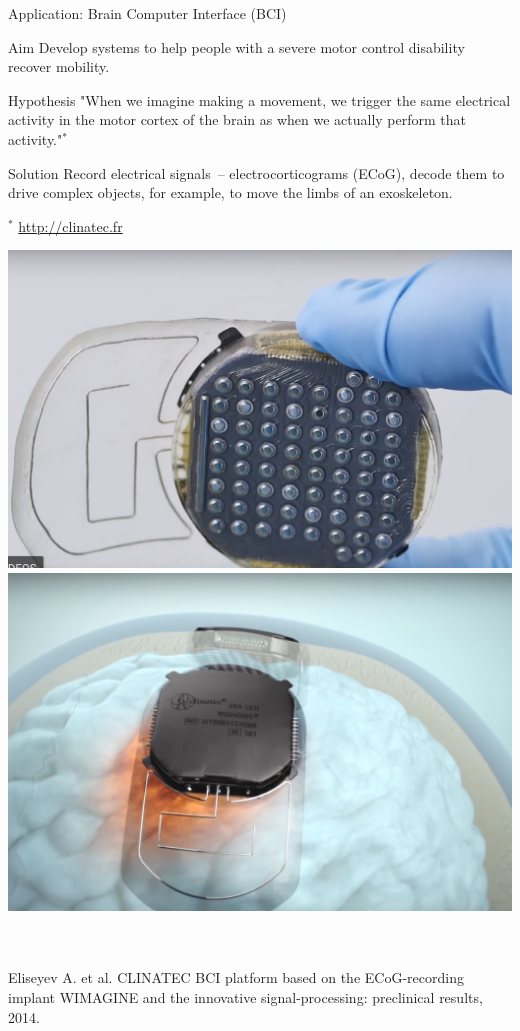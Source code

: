\documentclass[9pt]{beamer}
\begin{document}
\begin{frame}{Application: Brain Computer Interface (BCI)}
	\begin{minipage}{0.58\linewidth}
		\begin{block}{Aim}
		Develop systems to help people with a severe motor control disability recover mobility.
		\end{block}
	\begin{block}{Hypothesis}
	"When we imagine making a movement, we trigger the same electrical activity in the motor cortex of the brain as when we actually perform that activity."$^*$
	\end{block}
	\begin{block}{Solution}
	Record electrical signals~-- electrocorticograms (ECoG), decode them to drive complex objects, for example, to move the limbs of an exoskeleton. 
	\end{block}
	$^*$ \url{http://clinatec.fr}
	\end{minipage}%
\begin{minipage}{0.4\linewidth}
	\centering
	\includegraphics[width=0.9\linewidth]{figs/deviceClinatec} \\
	\vspace{0.5cm}
	\includegraphics[width=0.9\linewidth]{figs/brainClinatec}
\end{minipage}
\vspace{0.3cm} \\
\hrulefill \\
\small{Eliseyev A. et al. CLINATEC BCI platform based on the ECoG-recording implant WIMAGINE and the innovative signal-processing: preclinical results, 2014.}
\end{frame}
\end{document}
